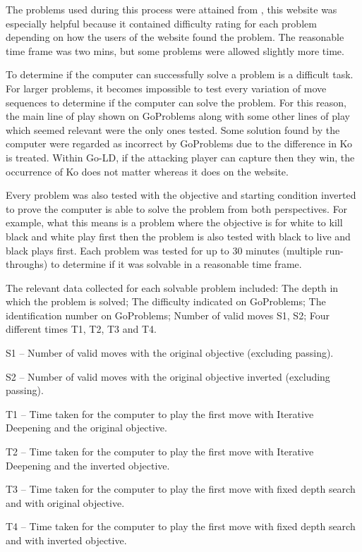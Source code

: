 \documentclass{l4proj}
\begin{document}
The problems used during this process were attained from \cite{GoProblems}, this website was especially helpful because it contained difficulty rating for each problem depending on how the users of the website found the problem. The reasonable time frame was two mins, but some problems were allowed slightly more time.

To determine if the computer can successfully solve a problem is a difficult task. For larger problems, it becomes impossible to test every variation of move sequences to determine if the computer can solve the problem. For this reason,  the main line of play shown on GoProblems along with some other lines of play which seemed relevant were the only ones tested. Some solution found by the computer were regarded as incorrect by GoProblems due to the difference in Ko is treated. Within Go-LD, if the attacking player can capture then they win, the occurrence of Ko does not matter whereas it does on the website.

Every problem was also tested with the objective and starting condition inverted to prove the computer is able to solve the problem from both perspectives. For example, what this means is a problem where the objective is for white to kill black and white play first then the problem is also tested with black to live and black plays first. Each problem was tested for up to 30 minutes (multiple run-throughs) to determine if it was solvable in a reasonable time frame.

The relevant data collected for each solvable problem included: The depth in which the problem is solved; The difficulty indicated on GoProblems; The identification number on GoProblems; Number of valid moves S1, S2; Four different times T1, T2, T3 and T4.

S1 – Number of valid moves with the original objective (excluding passing).

S2 – Number of valid moves with the original objective inverted (excluding passing).


T1 – Time taken for the computer to play the first move with Iterative Deepening and the original objective.

T2 – Time taken for the computer to play the first move with Iterative Deepening and the inverted objective.

T3 – Time taken for the computer to play the first move with fixed depth search and with original objective.

T4 – Time taken for the computer to play the first move with fixed depth search and with inverted objective.
\end{document}
